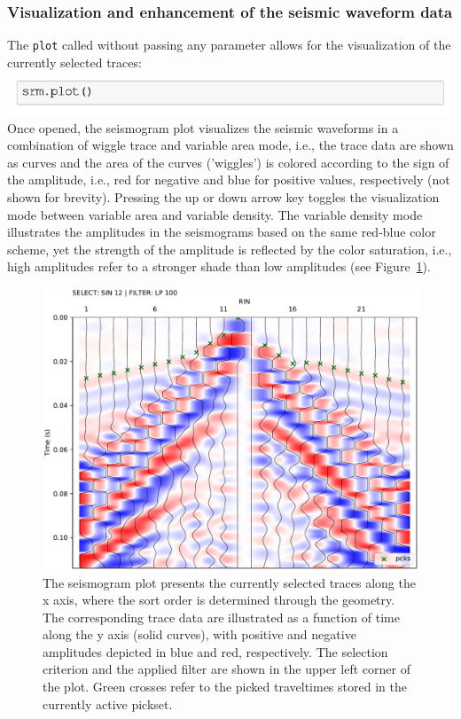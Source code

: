 \documentclass[a4paper,fleqn]{cas-sc}
\begin{document}
\subsubsection{Visualization and enhancement of the seismic waveform data}
The \texttt{plot} called without passing any parameter allows for the visualization of the currently selected traces:
\newline
\includegraphics[width=.5\textwidth]{./figures/plot.pdf}
\newline
Once opened, the seismogram plot visualizes the seismic waveforms in a combination of wiggle trace and variable area mode, i.e., the trace data are shown as curves and the area of the curves ('wiggles') is colored according to the sign of the amplitude, i.e., red for negative and blue for positive values, respectively (not shown for brevity). Pressing the up or down arrow key toggles the visualization mode between variable area and variable density. The variable density mode illustrates the amplitudes in the seismograms based on the same red-blue color scheme, yet the strength of the amplitude is reflected by the color saturation, i.e., high amplitudes refer to a stronger shade than low amplitudes (see Figure~\ref{fig:srm_intro}).
\begin{figure}
	\centering
	\includegraphics[width=.75\textwidth]{figures/pickwindow_intro.pdf}
	\caption{The seismogram plot presents the currently selected traces along the x axis, where the sort order is determined through the geometry. The corresponding trace data are illustrated as a function of time along the y axis (solid curves), with positive and negative amplitudes depicted in blue and red, respectively. The selection criterion and the applied filter are shown in the upper left corner of the plot. Green crosses refer to the picked traveltimes stored in the currently active pickset.}
	\label{fig:srm_intro}
\end{figure}
\end{document}
